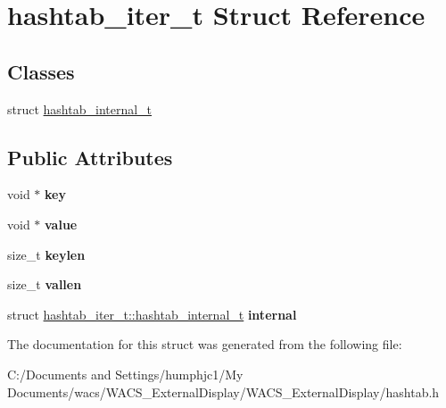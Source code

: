 \hypertarget{structhashtab__iter__t}{
\section{hashtab\_\-iter\_\-t Struct Reference}
\label{structhashtab__iter__t}
}
\subsection*{Classes}
\begin{DoxyCompactItemize}
\item 
struct \hyperlink{structhashtab__iter__t_1_1hashtab__internal__t}{hashtab\_\-internal\_\-t}
\end{DoxyCompactItemize}
\subsection*{Public Attributes}
\begin{DoxyCompactItemize}
\item 
\hypertarget{structhashtab__iter__t_a9353ae29fee228b81e7f678fa46b16d2}{
void $\ast$ {\bfseries key}}
\label{structhashtab__iter__t_a9353ae29fee228b81e7f678fa46b16d2}

\item 
\hypertarget{structhashtab__iter__t_a85160d0208e65d8090a0814c1317e436}{
void $\ast$ {\bfseries value}}
\label{structhashtab__iter__t_a85160d0208e65d8090a0814c1317e436}

\item 
\hypertarget{structhashtab__iter__t_a70ca548763acea5d241e7f5ae4d3e423}{
size\_\-t {\bfseries keylen}}
\label{structhashtab__iter__t_a70ca548763acea5d241e7f5ae4d3e423}

\item 
\hypertarget{structhashtab__iter__t_a1f924e3402808defb6b8909b5d88e60a}{
size\_\-t {\bfseries vallen}}
\label{structhashtab__iter__t_a1f924e3402808defb6b8909b5d88e60a}

\item 
\hypertarget{structhashtab__iter__t_a7a4de92ffa8021274c669507b29e551f}{
struct \hyperlink{structhashtab__iter__t_1_1hashtab__internal__t}{hashtab\_\-iter\_\-t::hashtab\_\-internal\_\-t} {\bfseries internal}}
\label{structhashtab__iter__t_a7a4de92ffa8021274c669507b29e551f}

\end{DoxyCompactItemize}


The documentation for this struct was generated from the following file:\begin{DoxyCompactItemize}
\item 
C:/Documents and Settings/humphjc1/My Documents/wacs/WACS\_\-ExternalDisplay/WACS\_\-ExternalDisplay/hashtab.h\end{DoxyCompactItemize}
